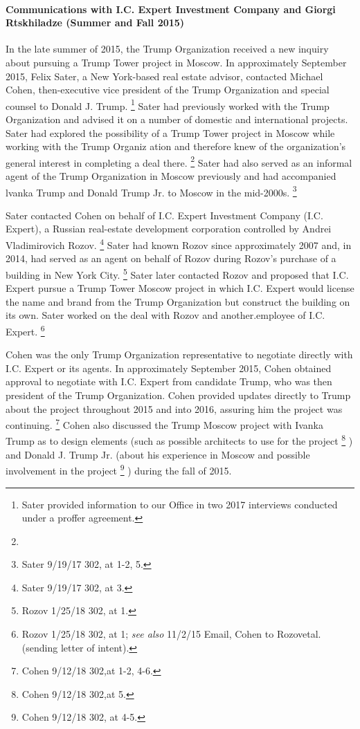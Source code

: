 \paragraph{Communications with I.C. Expert Investment Company and Giorgi Rtskhiladze (Summer and Fall 2015)}

In the late summer of 2015, the Trump Organization received a new inquiry about pursuing a Trump Tower project in Moscow.
In approximately September 2015, Felix Sater, a New York-based real estate advisor, contacted Michael Cohen, then-executive vice president of the Trump Organization and special counsel to Donald J. Trump.%
\footnote{Sater provided information to our Office in two 2017 interviews conducted under a proffer agreement.
}
Sater had previously worked with the Trump Organization and advised it on a number of domestic and international projects.
Sater had explored the possibility of a Trump Tower project in Moscow while working with the Trump Organiz ation and therefore knew of the organization's general interest in completing a deal there.%
\footnote{}
Sater had also served as an informal agent of the Trump Organization in Moscow previously and had accompanied lvanka Trump and Donald Trump Jr. to Moscow in the mid-2000s.%
\footnote{Sater 9/19/17 302, at 1-2, 5.}

Sater contacted Cohen on behalf of I.C. Expert Investment Company (I.C. Expert), a Russian real-estate development corporation controlled by Andrei Vladimirovich Rozov.%
\footnote{Sater 9/19/17 302, at 3.}
Sater had known Rozov since approximately 2007 and, in 2014, had served as an agent on behalf of Rozov during Rozov's purchase of a building in New York City.%
\footnote{Rozov 1/25/18 302, at 1.}
Sater later contacted Rozov and proposed that I.C. Expert pursue a Trump Tower Moscow project in which I.C. Expert would license the name and brand from the Trump Organization but construct the building on its own.
Sater worked on the deal with Rozov and another.employee of I.C. Expert.%
\footnote{Rozov 1/25/18 302, at 1;
\textit{see also} 11/2/15 Email, Cohen to Rozovetal. (sending letter of intent).}

Cohen was the only Trump Organization representative to negotiate directly with I.C. Expert or its agents.
In approximately September 2015, Cohen obtained approval to negotiate with I.C. Expert from candidate Trump, who was then president of the Trump Organization.
Cohen provided updates directly to Trump about the project throughout 2015 and into 2016, assuring him the project was continuing.%
\footnote{Cohen 9/12/18 302,at 1-2, 4-6.}
Cohen also discussed the Trump Moscow project with Ivanka Trump as to design elements (such as possible architects to use for the project%
\footnote{Cohen 9/12/18 302,at 5.}
) and Donald J. Trump Jr. (about his experience in Moscow and possible involvement in the project%
\footnote{Cohen 9/12/18 302, at 4-5.}
) during the fall of 2015.

